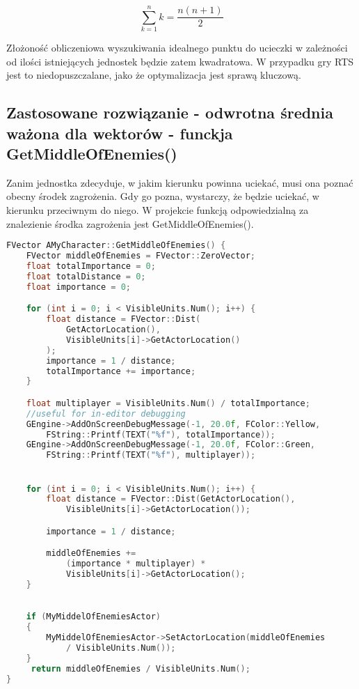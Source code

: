 \documentclass[12pt]{report}
\begin{document}
$$\sum\limits_{k=1}^n k = \frac{n(n+1)}{2}$$

Złożoność obliczeniowa wyszukiwania idealnego punktu do ucieczki w zależności od ilości istniejących jednostek będzie zatem kwadratowa. W przypadku gry RTS jest to niedopuszczalane, jako że optymalizacja jest sprawą kluczową.


\subsection{Zastosowane rozwiązanie - odwrotna średnia ważona dla wektorów - funckja GetMiddleOfEnemies()}

Zanim jednostka zdecyduje, w jakim kierunku powinna uciekać, musi ona poznać obecny środek zagrożenia. Gdy go pozna, wystarczy, że będzie uciekać, w kierunku przeciwnym do niego. W projekcie funkcją odpowiedzialną za znalezienie środka zagrożenia jest GetMiddleOfEnemies().

\begin{lstlisting}[language=C++, backgroundcolor=\color{black!5}, basicstyle=\footnotesize, caption=Funkcja GetMiddleOfEnemies() w klasie AMyCharacter]
FVector AMyCharacter::GetMiddleOfEnemies() {
	FVector middleOfEnemies = FVector::ZeroVector;
	float totalImportance = 0;		
	float totalDistance = 0;
	float importance = 0;

	for (int i = 0; i < VisibleUnits.Num(); i++) {
		float distance = FVector::Dist(
		    GetActorLocation(), 
		    VisibleUnits[i]->GetActorLocation()
		);
		importance = 1 / distance;
		totalImportance += importance;
	}

	float multiplayer = VisibleUnits.Num() / totalImportance;
	//useful for in-editor debugging
	GEngine->AddOnScreenDebugMessage(-1, 20.0f, FColor::Yellow, 
	    FString::Printf(TEXT("%f"), totalImportance));
	GEngine->AddOnScreenDebugMessage(-1, 20.0f, FColor::Green, 
	    FString::Printf(TEXT("%f"), multiplayer));


	for (int i = 0; i < VisibleUnits.Num(); i++) {
		float distance = FVector::Dist(GetActorLocation(), 
		    VisibleUnits[i]->GetActorLocation());

		importance = 1 / distance;

		middleOfEnemies += 
		    (importance * multiplayer) *  
		    VisibleUnits[i]->GetActorLocation();
	}

	
	if (MyMiddelOfEnemiesActor)
	{
		MyMiddelOfEnemiesActor->SetActorLocation(middleOfEnemies 
		    / VisibleUnits.Num());
	}
	 return middleOfEnemies / VisibleUnits.Num();
}
\end{lstlisting}
\end{document}
